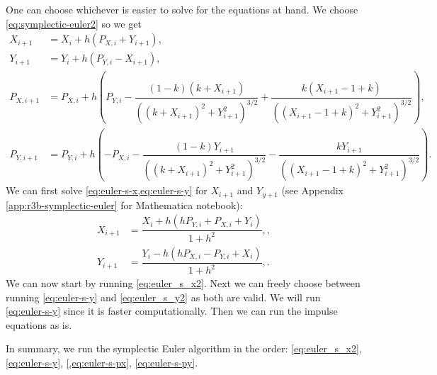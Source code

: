 One can choose whichever is easier to solve for the equations at hand. We choose \cref{eq:symplectic-euler2} so we get
\begin{align}
    X_{i+1} &= X_i + h (P_{X,i} + Y_{i+1}), \label{eq:euler-s-x} \\[0.2cm]
    Y_{i+1} &= Y_i + h (P_{Y,i} - X_{i+1}), \label{eq:euler-s-y} \\[0.2cm]
    P_{X,i+1} &= P_{X,i} + h \left(P_{Y,i} - \dfrac{(1-k)(k+X_{i+1})}{((k+X_{i+1})^2+Y_{i+1}^2)^{3/2}} + \dfrac{k(X_{i+1}-1+k)}{((X_{i+1}-1+k)^2+Y_{i+1}^2)^{3/2}}\right), \label{eq:euler-s-px} \\[0.2cm]
    P_{Y,i+1} &= P_{Y,i} + h \left(-P_{X,i} - \dfrac{(1-k)Y_{i+1}}{((k+X_{i+1})^2+Y_{i+1}^2)^{3/2}} - \dfrac{k Y_{i+1}}{((X_{i+1}-1+k)^2+Y_{i+1}^2)^{3/2}}\right). \label{eq:euler-s-py}
\end{align}
We can first solve \cref{eq:euler-s-x,eq:euler-s-y} for $X_{i+1}$ and $Y_{y+1}$ (see Appendix \ref{app:r3b-symplectic-euler} for Mathematica notebook):
\begin{align}
X_{i+1} &= \dfrac{X_i + h (h P_{Y,i} + P_{X,i} + Y_i)}{1+h^2}, \label{eq:euler_s_x2} , \\[0.5cm]
Y_{i+1} &= \dfrac{Y_i - h (h P_{X,i} - P_{Y,i} + X_i)}{1+h^2}, \label{eq:euler_s_y2}.
\end{align}
We can now start by running \cref{eq:euler_s_x2}. Next we can freely choose between running \cref{eq:euler-s-y} and \cref{eq:euler_s_y2} as both are valid. We will run \cref{eq:euler-s-y} since it is faster computationally. Then we can run the impulse equations as is.


In summary, we run the symplectic Euler algorithm in the order: \cref{eq:euler_s_x2}, \cref{eq:euler-s-y}, \cref{,eq:euler-s-px}, \cref{eq:euler-s-py}.

